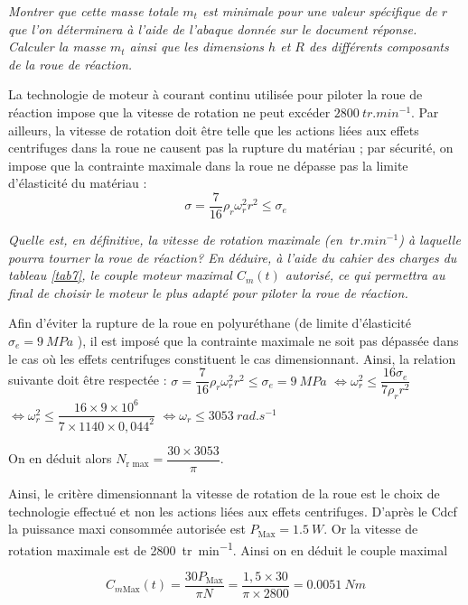 \else
\fi


  
  
\question{\label{q_17}}\textit{Montrer que cette masse totale $m_{t}$ est minimale pour
  une valeur spécifique de $r$ que l'on déterminera à l'aide de l'abaque donnée sur le document réponse. Calculer la masse
 $ m_{t}$ ainsi que les dimensions $h$ et $R$ des différents composants de la roue de réaction.}

\ifprof
\begin{corrige}

\end{corrige}
\else
\fi

\ifprof
\else
La technologie de moteur à courant continu utilisée pour piloter la roue
de réaction impose que la vitesse de rotation ne peut excéder $\SI{2800}{
tr.min^{-1}}$. Par ailleurs, la vitesse de rotation doit
être telle que les actions liées aux effets centrifuges dans la roue ne
causent pas la rupture du matériau ; par sécurité, on impose que la
contrainte maximale dans la roue ne dépasse pas la limite d'élasticité
du matériau :
$$
\sigma=\dfrac{7}{16}\rho_r\omega_r^2 r^2\leq \sigma_e
$$
\fi


\question{\label{q_18}}\textit{Quelle est, en définitive, la vitesse de rotation maximale (en
  $\SI{}{tr.min^{-1}}$) à laquelle pourra tourner la roue de
  réaction? En déduire, à l'aide du cahier des charges du tableau \ref{tab7},
  le couple moteur maximal $C_m(t)$ autorisé, ce qui permettra au final de
  choisir le moteur le plus adapté pour piloter la roue de réaction.}
\ifprof
\begin{corrige}

Afin d’éviter la rupture de la roue en polyuréthane (de limite d’élasticité $\sigma_e = \SI{9}{MPa}$ ), il est
imposé que la contrainte maximale ne soit pas dépassée dans le cas où les effets centrifuges
constituent le cas dimensionnant.
Ainsi, la relation suivante doit être respectée :
$\sigma = \dfrac{7}{16}\rho_r \omega_r^2r^2 \leq \sigma_e =\SI{9}{MPa}$ 
$\Longleftrightarrow \omega_r^2 \leq \dfrac{16 \sigma_e}{7\rho_r r^2}$
$\Longleftrightarrow \omega_r^2 \leq \dfrac{16\times 9\times 10^{6}}{7\times 1140\times 0,044^2}$
$\Longleftrightarrow \omega_r \leq \SI{3053}{rad.s^{-1}}$


On en déduit alors $N_{\text{r max}}=\dfrac{30\times 3053}{\pi}$.

Ainsi, le critère dimensionnant la vitesse de rotation de la roue est le choix de technologie
effectué et non les actions liées aux effets centrifuges.
D’après le Cdcf la puissance maxi consommée autorisée est $P_{\text{Max}}=\SI{1,5}{W}$. Or la vitesse de
rotation maximale est de \SI{2800}{tr.min^{-1}}. Ainsi on en déduit le couple maximal

$$
C_{m\text{Max}}(t)=\dfrac{30 P_{\text{Max}}}{\pi N} = \dfrac{1,5\times 30}{\pi \times 2800} = \SI{0,0051}{Nm}
$$

\end{corrige}
\else
\fi


